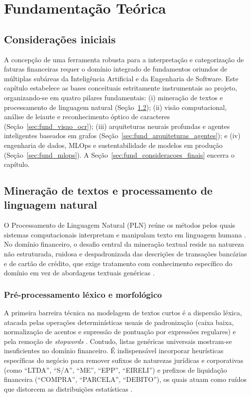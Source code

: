 \chapter{Fundamentação Teórica} \label{Cap:Fund_Teo}

\label{chp:fundamentacao}

\section{Considerações iniciais}
\label{sec:fund_consideracoes_iniciais}

A concepção de uma ferramenta robusta para a interpretação e categorização de faturas financeiras requer o domínio integrado de fundamentos oriundos de múltiplas subáreas da Inteligência Artificial e da Engenharia de Software. Este capítulo estabelece as bases conceituais estritamente instrumentais ao projeto, organizando-se em quatro pilares fundamentais: (i) mineração de textos e processamento de linguagem natural (Seção~\ref{sec:fund_pln}); (ii) visão computacional, análise de leiaute e reconhecimento óptico de caracteres (Seção~\ref{sec:fund_visao_ocr}); (iii) arquiteturas neurais profundas e agentes inteligentes baseados em grafos (Seção~\ref{sec:fund_arquiteturas_agentes}); e (iv) engenharia de dados, MLOps e sustentabilidade de modelos em produção (Seção~\ref{sec:fund_mlops}). A Seção~\ref{sec:fund_consideracoes_finais} encerra o capítulo.

\section{Mineração de textos e processamento de linguagem natural}
\label{sec:fund_pln}

O Processamento de Linguagem Natural (PLN) reúne os métodos pelos quais sistemas computacionais interpretam e manipulam texto em linguagem humana \cite{BPLN_livro:2024, chowdhury2003natural}. No domínio financeiro, o desafio central da mineração textual reside na natureza não estruturada, ruidosa e despadronizada das descrições de transações bancárias e de cartão de crédito, que exige tratamento com conhecimento específico do domínio em vez de abordagens textuais genéricas \cite{ta2023specialized}.

\subsection{Pré-processamento léxico e morfológico}
A primeira barreira técnica na modelagem de textos curtos é a dispersão léxica, atacada pelas operações determinísticas usuais de padronização (caixa baixa, normalização de acentos e supressão de pontuação por expressões regulares) e pela remoção de \textit{stopwords} \cite{BPLN_livro:2024, matos2010pre}. Contudo, listas genéricas universais mostram-se insuficientes no domínio financeiro. É indispensável incorporar heurísticas específicas do negócio para remover sufixos de naturezas jurídicas e corporativas (como ``LTDA'', ``S/A'', ``ME'', ``EPP'', ``EIRELI'') e prefixos de liquidação financeira (``COMPRA'', ``PARCELA'', ``DEBITO''), os quais atuam como ruídos que distorcem as distribuições estatísticas \cite{ta2023specialized}.

